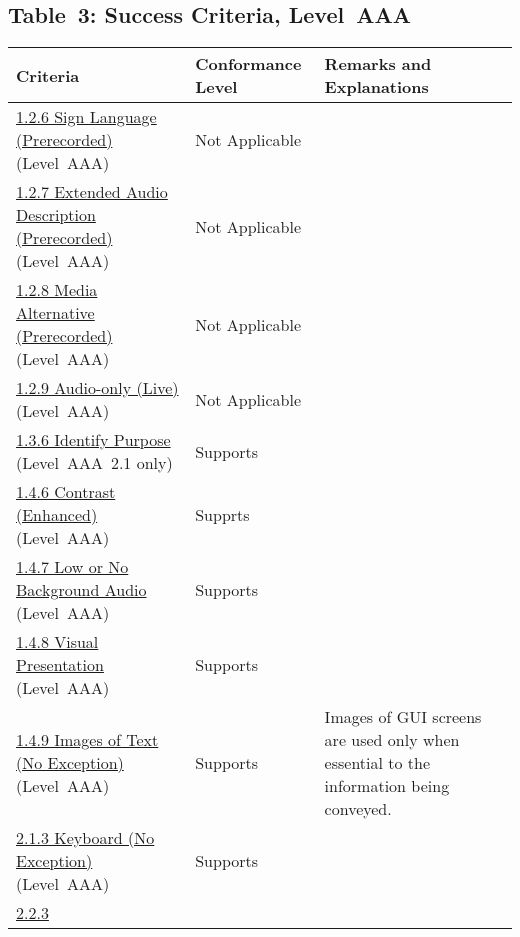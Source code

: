 \documentclass{report}
\begin{document}
\subsection{Table~3:  Success Criteria, Level~AAA}
\begin{longtable}{p{}<{\RaggedRight}p{}<{\RaggedRight}p{}<{\RaggedRight}}
  \toprule
  Criteria & Conformance Level & Remarks and Explanations \\
  \midrule
  \endhead
  \bottomrule
  \endfoot
  \href{http://www.w3.org/TR/WCAG20/#media-equiv-sign}{1.2.6 Sign
  Language (Prerecorded)} (Level~AAA) & Not Applicable\\
  \href{http://www.w3.org/TR/WCAG20/#media-equiv-extended-ad}{1.2.7
  Extended Audio Description (Prerecorded)} (Level~AAA) & Not
                                                          Applicable\\
  \href{http://www.w3.org/TR/WCAG20/#media-equiv-text-doc}{1.2.8 Media
  Alternative (Prerecorded)} (Level~AAA) & Not Applicable\\
  \href{http://www.w3.org/TR/WCAG20/#media-equiv-live-audio-only}{1.2.9
  Audio-only (Live)} (Level~AAA) & Not Applicable\\
  \href{https://www.w3.org/TR/WCAG21/#identify-purpose}{1.3.6 Identify
  Purpose} (Level~AAA~2.1 only) & Supports\\
  \href{http://www.w3.org/TR/WCAG20/#visual-audio-contrast7}{1.4.6
  Contrast (Enhanced)} (Level~AAA) & Supprts\\
  \href{http://www.w3.org/TR/WCAG20/#visual-audio-contrast-noaudio}{1.4.7
  Low or No Background Audio} (Level~AAA) & Supports \\
  \href{http://www.w3.org/TR/WCAG20/#visual-audio-contrast-visual-presentation}{1.4.8
  Visual Presentation} (Level~AAA) & Supports\\
  \href{http://www.w3.org/TR/WCAG20/#visual-audio-contrast-text-images}{1.4.9
  Images of Text (No Exception)} (Level~AAA) & Supports & Images of
                                                          GUI screens are used
                                                          only when
                                                          essential to
                                                          the information being conveyed.\\
  \href{http://www.w3.org/TR/WCAG20/#keyboard-operation-all-funcs}{2.1.3
  Keyboard (No Exception)} (Level~AAA) & Supports\\
  \href{http://www.w3.org/TR/WCAG20/#time-limits-no-exceptions}{2.2.3
}
\end{longtable}
\end{document}
